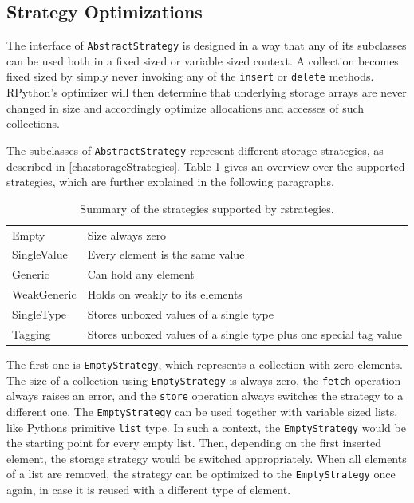 \documentclass[english,10pt]{sigplanconf}
\begin{document}
\subsection{Strategy Optimizations}
\label{sec:solutionOptimizations}

The interface of \lstinline{AbstractStrategy} is designed in a way
that any of its subclasses can be used both in a fixed sized or
variable sized context.  A collection becomes fixed sized by simply
never invoking any of the \lstinline{insert} or \lstinline{delete}
methods.  RPython's optimizer will then determine that underlying
storage arrays are never changed in size and accordingly optimize
allocations and accesses of such collections.

The subclasses of \lstinline{AbstractStrategy} represent different
storage strategies, as described in \autoref{cha:storageStrategies}. Table
\ref{tab:strategiesOverwiew} gives an overview over the supported strategies,
which are further explained in the following paragraphs.

\begin{table}
\centering
\caption{Summary of the strategies supported by rstrategies.}
\label{tab:strategiesOverwiew}
\begin{tabularx}{\linewidth}{ l X}
\toprule
Empty & Size always zero \\
SingleValue & Every element is the same value \\
Generic & Can hold any element \\
WeakGeneric & Holds on weakly to its elements \\
SingleType & Stores unboxed values of a single type \\
Tagging & Stores unboxed values of a single type plus one special tag value \\
\bottomrule
\end{tabularx}
\end{table}

The first one is \lstinline{EmptyStrategy}, which represents a
collection with zero elements.  The size of a collection using
\lstinline{EmptyStrategy} is always zero, the \lstinline{fetch}
operation always raises an error, and the \lstinline{store} operation
always switches the strategy to a different one.  The
\lstinline{EmptyStrategy} can be used together with variable sized
lists, like Pythons primitive \lstinline{list} type.  In such a
context, the \lstinline{EmptyStrategy} would be the starting point for
every empty list.  Then, depending on the first inserted element, the
storage strategy would be switched appropriately.  When all elements
of a list are removed, the strategy can be optimized to the
\lstinline{EmptyStrategy} once again, in case it is reused with a
different type of element.
\end{document}
